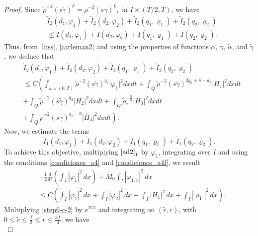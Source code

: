 \documentclass[11pt,a4paper]{amsart}
\numberwithin{equation}{section}
\begin{document}
\begin{proof}
\noindent Since $\displaystyle \tilde{\rho}^{-2}(s\tilde{\gamma})^{k} = \displaystyle {\rho}^{-2}(s{\gamma})^{k}, $ in $I \times(T/2, T)$, we have 
\begin{align}\label{liiss}
    &\tilde{I}_{2}(d_{1},\varphi_1)+\tilde{I}_{2}(d_{2},\varphi_{2})+\tilde{I}_{2}(q_{1},\varrho_1)+\tilde{I}_{2}(q_{2},\varrho_{2}) \\
    &\leq I(d_{1},\varphi_1)+I(d_{2},\varphi_{2})+I(q_{1},\varrho_1)+I(q_{2},\varrho_{2}). \nonumber
\end{align}Thus, from \eqref{liiss}, \eqref{carleman2} and using the properties of  functions $\alpha,\, \gamma,\, \tilde{\alpha}$, and  $\tilde{\gamma}$, we  deduce  that
\begin{equation}\label{step6-c-1}
\begin{split}
& \tilde{I}_{2}(d_{1},\varphi_1)+\tilde{I}_{2}(d_{2},\varphi_{2})+\tilde{I}_{2}(q_{1},\varrho_1)+\tilde{I}_{2}(q_{2},\varrho_{2})\\
&\leq C\left(\int_{\omega\times (0,T)}\tilde{\rho}^{-2}(s\tilde{\gamma})^{q_3}\vert \varphi_1 \vert^2dxdt +\int_{Q}\tilde{\rho}^{-2}(s\tilde{\gamma})^{2q_{2}+8-d_{2}}\vert H_1\vert^2dxdt \right.\\
&+ \int_{Q}\tilde{\rho}^{-2}(s\tilde{\gamma})^{q_2}\vert H_2\vert^2dxdt+ \int_{Q}\tilde{\rho}^{-\frac{8}{5}}_{*} \vert \overline{H}_3\vert^2  dxdt\\
& \left.  +\int_{Q}\tilde{\rho}^{-2}(s\tilde{\gamma})^{q_2-3} \vert \overline{H}_4\vert^2  dxdt \right).
\end{split}
\end{equation}Now, we estimate  the  terms $$\tilde{I}_{1}(d_{1},\varphi_1)+\tilde{I}_{1}(d_{2},\varphi_{2})+\tilde{I}_{1}(q_{1},\varrho_1)+\tilde{I}_{1}(q_{2},\varrho_{2}).$$ To achieve this objective, multiplying   $\eqref{ad2}_{1}$  by $\varphi_1$,   integrating  over $I$ and using the conditions \eqref{condiciones_a4} and \eqref{condiciones_a4f},  we result
\begin{align}\label{step6-c-2}
&-\frac{1}{2}\frac{d}{dt}\left(\int_{I}|\varphi_{1}|^{2}\,dx\right)+M_{0}\int_{I}|\varphi_{1,x}|^{2}\,dx\\
&\leq C\left(\int_{I}|\varphi_{1}|^{2}\,dx+ \int_{I}|\varphi_{2}|^{2}\,dx+\int_{I}|H_1|^{2}\,dx+\int_{I}|\varrho_{1}|^{2}\,dx\right). \nonumber
\end{align}Multiplying \eqref{step6-c-2} by  $e^{2Ct}$ and integrating on  $(\tilde{r},r)$,  with  $0 \leq \tilde{r} \leq \frac{T}{2}\leq r \leq \frac{3T}{4}$, we have
\begin{equation*}

\end{equation*}
\end{proof}
\end{document}
